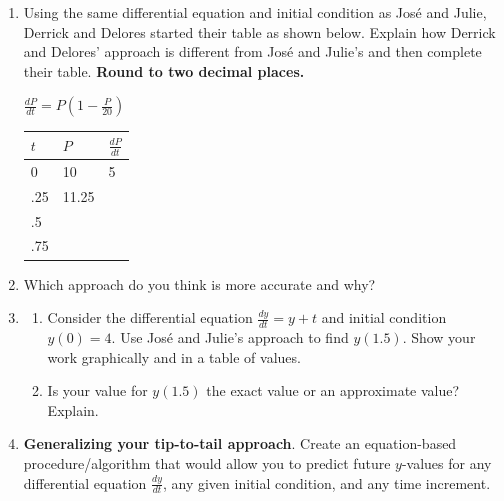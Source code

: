 \begin{enumerate}[resume]
\item	Using the same differential equation and initial condition as Jos{\'e} and Julie, Derrick and Delores started their table as shown below. Explain how Derrick and Delores' approach is different from Jos{\'e} and Julie's and then complete their table. \textbf{Round to two decimal places.} \label{02problem6}

{
$\displaystyle  \frac{dP}{dt}=P\left( 1-\frac{P}{20}\right) $
 
\renewcommand{\arraystretch}{1.5}
%
\begin{tabularx}{.4\textwidth}{ |R|R|R| }
\hline
$t$ & $P$ & $\frac{dP}{dt}$\\ & 10 & 5\\\hline
.25 & 11.25 & \\\hline
.5&&\\\hline
.75&&\\\hline
\end{tabularx}}
\vfill

\item Which approach do you think is more accurate and why? \label{02problem7}
\vfill

\clearpage

\item
\begin{enumerate}
\item Consider the differential equation $\displaystyle\frac{dy}{dt}=y+t$ and initial condition $y(0) = 4$. Use Jos{\'e} and Julie's approach to find $y(1.5)$. Show your work graphically and in a table of values. \label{02problem8parta}
\vfill
\vfill
\item Is your value for $y(1.5)$ the exact value or an approximate value? Explain. \label{02problem8partb}
\vfill
\end{enumerate}
\item	\textbf{Generalizing your tip-to-tail approach}. Create an equation-based procedure/algorithm that would allow you to predict future $y$-values for any differential equation $\displaystyle\frac{dy}{dt}$, any given initial condition, and any time increment. \label{02problem9} \vfill \vfill

\end{enumerate}

